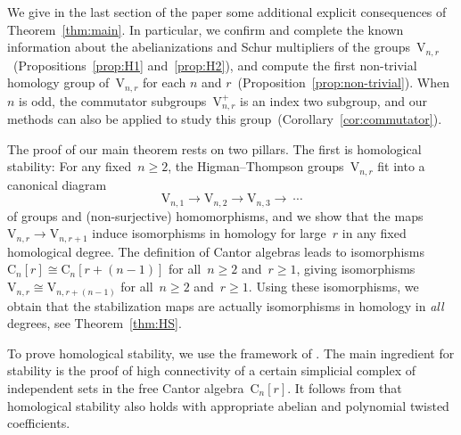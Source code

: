 \documentclass[10pt]{article}
\newcommand{\Can}{\mathbf{Cantor}}
\newcommand{\rmC}{\mathrm{C}}
\newcommand{\rmV}{\mathrm{V}}
\newcommand{\x}{\times}
\theoremstyle{definition}
\numberwithin{theorem}{section}
\numberwithin{equation}{section}
\numberwithin{figure}{section}
\begin{document}
We give in the last section of the paper some additional explicit
consequences of Theorem~\ref{thm:main}. In particular, we confirm and
complete the known information about the abelianizations and Schur
multipliers of the groups~$\rmV_{n,r}$~(Propositions~\ref{prop:H1}
and~\ref{prop:H2}), and compute the first non-trivial homology group
of~$\rmV_{n,r}$ for each $n$ and $r$~(Proposition~\ref{prop:non-trivial}). 
When~$n$ is odd, the commutator subgroups~$\rmV_{n,r}^+$ is an index two subgroup, and our methods can also be applied to study this group~(Corollary~\ref{cor:commutator}).  



The proof of our main theorem %
rests on two pillars. The first is homological stability: For any fixed~\hbox{$n\geqslant 2$}, the Higman--Thompson groups~$\rmV_{n,r}$ fit into a canonical diagram
\begin{equation}\label{eq:canonical_diagram}
\rmV_{n,1}
\longrightarrow\rmV_{n,2}
\longrightarrow\rmV_{n,3}
\longrightarrow\ \cdots\tag{$\star$}
\end{equation}
of groups and (non-surjective) homomorphisms, and we show that the maps~$\rmV_{n,r}\to\rmV_{n,r+1}$ induce isomorphisms in homology for large~$r$ in any fixed homological degree. 
The definition of Cantor algebras leads to isomorphisms~\hbox{$\rmC_{n}[r]\cong\rmC_{n}[r+(n-1)]$} for all~$n\geqslant 2$ and~$r\geqslant1$, giving isomorphisms%
~$\rmV_{n,r}\cong\rmV_{n,r+(n-1)}$ for all~$n\geqslant 2$ and~$r\geqslant1$. 
Using %
these isomorphisms, we obtain that the stabilization maps are actually
isomorphisms in homology in  {\em all} degrees, see Theorem~\ref{thm:HS}. 


To prove homological stability, we use the framework of \cite{Randal-Williams+Wahl}. 
The main ingredient for stability is the proof of high connectivity of a certain simplicial complex of independent sets in the free Cantor algebra~$\rmC_{n}[r]$. 
It follows from \cite{Randal-Williams+Wahl} that homological stability also holds with appropriate abelian and polynomial twisted coefficients. 
\end{document}
